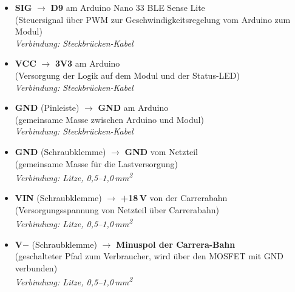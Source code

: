 \begin{itemize}
	\item \textbf{SIG} $\rightarrow$ \textbf{D9} am Arduino Nano 33 BLE Sense Lite \\
	(Steuersignal über PWM zur Geschwindigkeitsregelung vom Arduino zum Modul)\\
	\textit{Verbindung: Steckbrücken-Kabel}
	
	\item \textbf{VCC} $\rightarrow$ \textbf{3V3} am Arduino \\
	(Versorgung der Logik auf dem Modul und der Status-LED)\\
	\textit{Verbindung: Steckbrücken-Kabel}
	
	\item \textbf{GND} (Pinleiste) $\rightarrow$ \textbf{GND} am Arduino \\
	(gemeinsame Masse zwischen Arduino und Modul)\\
	\textit{Verbindung: Steckbrücken-Kabel}
	
	\item \textbf{GND} (Schraubklemme) $\rightarrow$ \textbf{GND} vom Netzteil \\
	(gemeinsame Masse für die Lastversorgung)\\
	\textit{Verbindung: Litze, 0{,}5--1{,}0\,mm\textsuperscript{2}}
	
	\item \textbf{VIN} (Schraubklemme) $\rightarrow$ \textbf{+18\,V} von der Carrerabahn \\
	(Versorgungsspannung von Netzteil über Carrerabahn)\\
	\textit{Verbindung: Litze, 0{,}5--1{,}0\,mm\textsuperscript{2}}
	
	\item \textbf{V$-$} (Schraubklemme) $\rightarrow$ \textbf{Minuspol der Carrera-Bahn} \\
	(geschalteter Pfad zum Verbraucher, wird über den MOSFET mit GND verbunden)\\
	\textit{Verbindung: Litze, 0{,}5--1{,}0\,mm\textsuperscript{2}}
	
\end{itemize}

